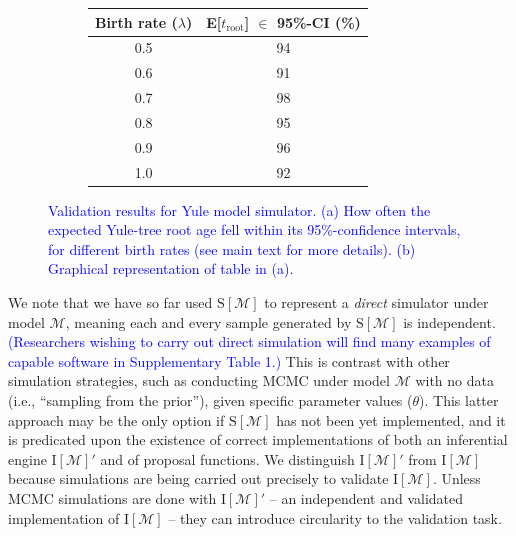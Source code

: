 \documentclass[oneside]{article}
\begin{document}
\begin{figure}
  \centering
  \vspace{0pt}
  \begin{subfigure}[t]{0.4\textwidth}
    \caption{}
    \centering
    \begin{tabular}{ cc }
    \hline
    Birth rate ($\lambda$) & E[$t_{\text{root}}$] $\in$ 95\%-CI (\%)\\
    \hline  
    \rowcolor{gray!10}0.5 & 94\\
    0.6 & 91\\
    \rowcolor{gray!10}0.7 & 98\\
    0.8 & 95\\
    \rowcolor{gray!10}0.9 & 96\\
    1.0 & 92
  \end{tabular}
  \end{subfigure}
  \vspace{0pt}
  \hspace{1cm}
  \begin{subfigure}[t]{0.4\textwidth}
    \caption{}
    \centering
    
  \end{subfigure}
  \caption{\textcolor{blue}{Validation results for Yule model simulator. (a) How often the expected Yule-tree root age fell within its 95\%-confidence intervals, for different birth rates (see main text for more details). (b) Graphical representation of table in (a).}}
  \label{fig:yulemean}
\end{figure}

We note that we have so far used $\text{S}[\mathcal{M}]$ to represent a \emph{direct} simulator under model $\mathcal{M}$, meaning each and every sample generated by $\text{S}[\mathcal{M}]$ is independent.
\textcolor{blue}{(Researchers wishing to carry out direct simulation will find many examples of capable software in Supplementary Table 1.)}
This is contrast with other simulation strategies, such as conducting MCMC under model $\mathcal{M}$ with no data (i.e., ``sampling from the prior''), given specific parameter values ($\theta$).
This latter approach may be the only option if $\text{S}[\mathcal{M}]$ has not been yet implemented, and it is predicated upon the existence of correct implementations of both an inferential engine $\text{I}[\mathcal{M}]'$ and of proposal functions.
We distinguish $\text{I}[\mathcal{M}]'$ from $\text{I}[\mathcal{M}]$ because simulations are being carried out precisely to validate $\text{I}[\mathcal{M}]$.
Unless MCMC simulations are done with $\text{I}[\mathcal{M}]'$ -- an independent and validated implementation of $\text{I}[\mathcal{M}]$ -- they can introduce circularity to the validation task.
\end{document}
